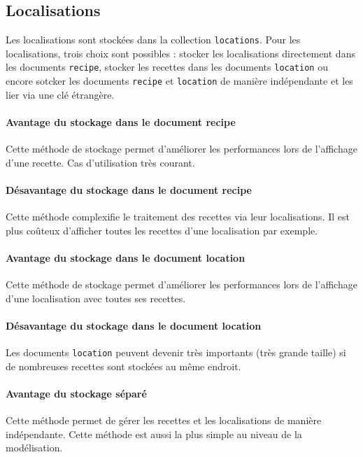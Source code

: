 	\subsection{Localisations}

		Les localisations sont stockées dans la collection \verb|locations|. Pour les localisations, trois choix sont possibles : stocker les localisations directement dans les documents \verb|recipe|, stocker les recettes dans les documents \verb|location| ou encore sotcker les documents \verb|recipe| et \verb|location| de manière indépendante et les lier via une clé étrangère.

		\paragraph{Avantage du stockage dans le document recipe}%
			Cette méthode de stockage permet d'améliorer les performances lors de l'affichage d'une recette. Cas d'utilisation très courant.

		\paragraph{Désavantage du stockage dans le document recipe}%
			Cette méthode complexifie le traitement des recettes via leur localisations. Il est plus coûteux d'afficher toutes les recettes d'une localisation par exemple.

		\paragraph{Avantage du stockage dans le document location}%
			Cette méthode de stockage permet d'améliorer les performances lors de l'affichage d'une localisation avec toutes ses recettes.

		\paragraph{Désavantage du stockage dans le document location}%
			Les documents \verb|location| peuvent devenir très importants (très grande taille) si de nombreuses recettes sont stockées au même endroit.

		\paragraph{Avantage du stockage séparé}%
			Cette méthode permet de gérer les recettes et les localisations de manière indépendante. Cette méthode est aussi la plus simple au niveau de la modélisation.

